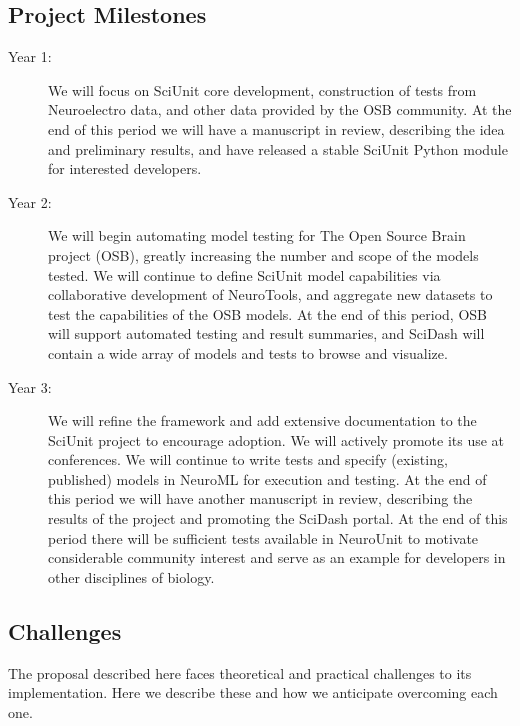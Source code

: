 \documentclass[11pt,letterpaper]{article}
\begin{document}
\subsection{Project Milestones}
\begin{description}
\item[Year 1:] We will focus on SciUnit core development, construction of tests from Neuroelectro data, and other data provided by the OSB community.  At the end of this period we will have a manuscript in review, describing the idea and preliminary results, and have released a stable SciUnit Python module for interested developers. 
\item[Year 2:] We will begin automating model testing for The Open Source Brain project (OSB), greatly increasing the number and scope of the models tested.  We will continue to define SciUnit model capabilities via collaborative development of NeuroTools, and aggregate new datasets to test the capabilities of the OSB models.  At the end of this period, OSB will support automated testing and result summaries, and SciDash will contain a wide array of models and tests to browse and visualize.  
\item[Year 3:] We will refine the framework and add extensive documentation to the SciUnit project to encourage adoption.  We will actively promote its use at conferences.  We will continue to write tests and specify (existing, published) models in NeuroML for execution and testing. At the end of this period we will have another manuscript in review, describing the results of the project and promoting the SciDash portal.  At the end of this period there will be sufficient tests available in NeuroUnit to motivate considerable community interest and serve as an example for developers in other disciplines of biology.  
\end{description}

\subsection{Challenges}
The proposal described here faces theoretical and practical challenges to its implementation.  Here we describe these and how we anticipate overcoming each one.
\end{document}
